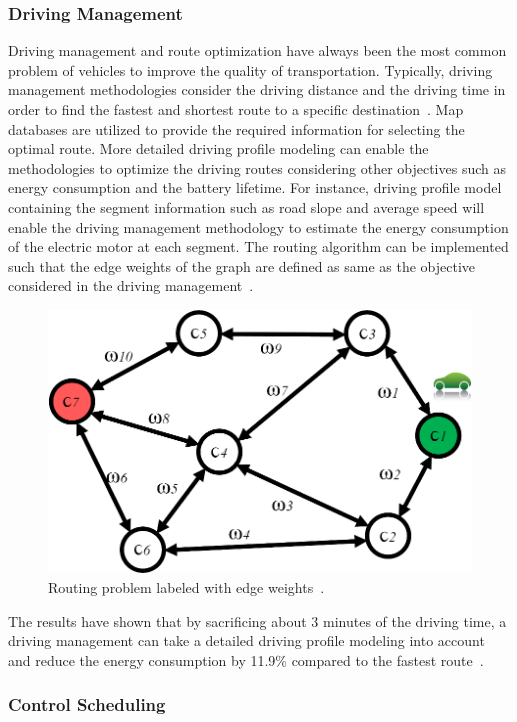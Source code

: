 \subsubsection{Driving Management}

Driving management and route optimization have always been the most common problem of vehicles to improve the quality of transportation. Typically, driving management methodologies consider the driving distance and the driving time in order to find the fastest and shortest route to a specific destination~\cite{AF_37,AF_38,AF_39}. Map databases are utilized to provide the required information for selecting the optimal route. More detailed driving profile modeling can enable the methodologies to optimize the driving routes considering other objectives such as energy consumption and the battery lifetime. For instance, driving profile model containing the segment information such as road slope and average speed will enable the driving management methodology to estimate the energy consumption of the electric motor at each segment. The routing algorithm can be implemented such that the edge weights of the graph are defined as same as the objective considered in the driving management~\cite{AF_40,AF_41,AF_42}. 

\begin{figure}
\centering
\includegraphics[width=0.7\hsize]{Figures/Al_Faruque/AF_figure3.png}
\caption{Routing problem labeled with edge weights~\cite{AF_11}.}
\label{AF_image3}
\end{figure}      

The results have shown that by sacrificing about 3 minutes of the driving time, a driving management can take a detailed driving profile modeling into account and reduce the energy consumption by 11.9\% compared to the fastest route~\cite{AF_11,AF_17}.

\subsubsection{Control Scheduling}

